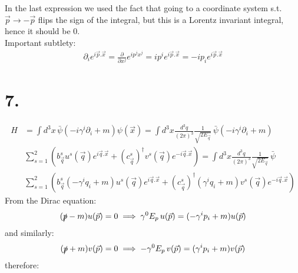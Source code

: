 \documentclass{article}
\newcommand{\pdotx}{\vec{p}.\vec{x}}
\newcommand{\qdotx}{\vec{q}.\vec{x}}
\newcommand{\vecx}{\vec{x}}
\newcommand{\vecp}{\vec{p}}
\newcommand{\vecq}{\vec{q}}
\newcommand{\slashp}{\slashed{p}}
\begin{document}
In the last expression we used the fact that going to a coordinate system s.t. $\vecp \to -\vecp$ flips the sign of the integral, but this is a Lorentz invariant integral, hence it should be 0.\\
Important subtlety:
\begin{equation}
    \begin{split}
        \partial_i e^{i\pdotx} = \frac{\partial}{\partial x^j}e^{ip^jx^j}=ip^ie^{i\pdotx}=-ip_ie^{i\pdotx}
    \end{split}
\end{equation}

\section*{7.}
\begin{equation}
    \begin{split}
        H &= \int d^3x \, \bar{\psi}(-i\gamma^i\partial_i+m)\psi(\vecx)=\int d^3x\frac{d^3q}{(2\pi)^3}\frac{1}{\sqrt{2E_{\vecq}}} \, \bar{\psi}(-i\gamma^i\partial_i+m)\\
        &  \sum_{s=1}^2 \left(b^s_{\vecq}u^s(\vecq)e^{i\qdotx}+(c^s_{\vecq} )^\dagger v^s(\vecq)e^{-i\qdotx}\right)=\int d^3x\frac{d^3q}{(2\pi)^3}\frac{1}{\sqrt{2E_{\vecq}}} \, \bar{\psi}\\
        & \sum_{s=1}^2\left(b^s_{\vecq}(-\gamma^iq_i+m)u^s(\vecq)e^{i\qdotx}+ (c^s_{\vecq} )^\dagger (\gamma^iq_i+m)v^s(\vecq)e^{-i\qdotx}\right)
    \end{split}
\end{equation}
From the Dirac equation:
\begin{equation}
    \begin{split}
        (\slashp - m)u(\vecp) = 0 \implies \gamma^0E_p\, u(\vecp)= (-\gamma^ip_i+m)u(\vecp)
    \end{split}
\end{equation}
and similarly:
\begin{equation}
    \begin{split}
        (\slashp + m)v(\vecp) = 0 \implies  -\gamma^0E_p\, v(\vecp)= (\gamma^ip_i+m)v(\vecp)
    \end{split}
\end{equation}
therefore:
\end{document}
